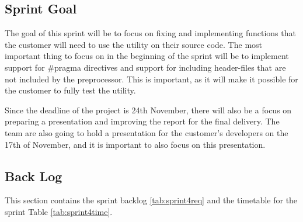 \subsection{Sprint Goal}
The goal of this sprint will be to focus on fixing and implementing functions that the customer will need to use the \gls{utility} on their source code. The most important thing to focus on in the beginning of the sprint will be to implement support for \#pragma directives and support for including \gls{header}-files that are not included by the \gls{preprocessor}. This is important, as it will make it possible for the customer to fully test the \gls{utility}.

Since the deadline of the project is 24th November, there will also be a focus on preparing a presentation and improving the report for the final delivery. The team are also going to hold a presentation for the customer's developers on the 17th of November, and it is important to also focus on this presentation.

\subsection{Back Log}
This section contains the sprint backlog \ref{tab:sprint4req} and the timetable for the sprint Table \ref{tab:sprint4time}.  

